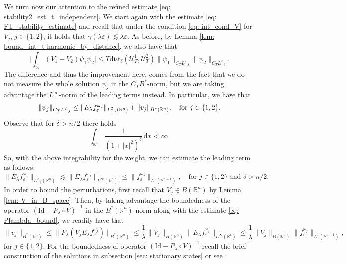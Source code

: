 \documentclass[10pt,a4paper]{amsart}
\theoremstyle{remark}
\theoremstyle{definition}
\newcommand{\R}{\mathbb{R}}
\newcommand{\Sph}{\mathbb{S}}
\newcommand{\dd}{\mathrm{d}}
\newcommand{\Id}{\mathrm{Id}}
\newcommand{\dist}{\mathrm{dist}}
\newcommand{\om}{\omega}
\def\ve{\varepsilon}
\def\lec{\lesssim}
\def\cal{\mathcal}
\def\ovl{\overline}
\begin{document}
We turn now our attention to the refined estimate  \eqref{eq: stability2_est_t_independent}. We start again with the estimate \eqref{eq: FT_stability_estimate} and recall that under the condition \eqref{eq: int_cond_V} for $V_j$, $j\in\{1, 2\}$, it holds that $\gamma(\lambda \ve) \lec \lambda \ve$. 
%
As before, by Lemma \ref{lem: bound_int_t-harmonic_by_distance}, we also have that 
%
\[
\Big| \int_\Sigma (V_1 - V_2)\psi_1 \ovl{\psi_2}\Big| \leq T \dist_\delta(\cal{U}^1_T, \cal{U}^2_T) \| \psi_1\|_{C_TL^2_{-\delta}} \|\psi_2\|_{C_TL^2_{-\delta}}.
\]
%
The difference and thus the improvement here, comes from the fact that we do not measure the whole solution $\psi_j$ in the $C_TB^*$-norm, but we are taking advantage the $L^\infty$-norm of the leading terms instead. 
In particular, we have that 
%
\[
\| \psi_j \|_{C_TL^2_{-\delta}} \leq \| E_\lambda f^{\om_j}_\ve \|_{L^2_{-\delta}(\R^n)} + \| v_j \|_{B^*(\R^n)}, \quad \textup{for} \,\, j\in\{1, 2\}. 
\]
%
%
Observe that for $\delta > n/2$ there holds 
\[
\int_{\R^n} \frac{1}{(1+|x|^2)^{\delta}} \, \dd x<\infty. 
\]
So, with the above integrability for the weight, we can estimate the leading term as follows: 
%
\begin{equation}\label{eq: Herglotz_bound}
\|E_\lambda f^{\om_j}_\ve \|_{L^2_{-\delta}(\R^n)} \lec \|E_\lambda f^{\om_j}_\ve\|_{L^\infty(\R^n)} \leq \|f^{\om_j}_\ve \|_{L^1(\Sph^{n-1})},
\quad \text{for} \,\, j\in\{1, 2\} \,\, \text{and} \,\, \delta>n/2.
\end{equation}
%
In order to bound the perturbations, first recall that $V_j\in B(\R^n)$ by Lemma \ref{lem: V_in_B_space}. Then, by taking advantage the boundedness of the operator $(\Id-P_\lambda \circ V)^{-1}$ in the $B^*(\R^n)$-norm along with the estimate \eqref{eq: Plambda_bound}, we readily have that 
%
\begin{equation}\label{eq: perturbation_Bstar_bound}
\| v_j \|_{B^*(\R^n)}\leq \| P_\lambda (V_j E_\lambda f^{\om_j}_\ve) \|_{B^*(\R^n)} \leq \frac{1}{\lambda} \| V_j \|_{B(\R^n)} \|E_\lambda f^{\om_j}_\ve \|_{L^\infty(\R^n)}
\leq \frac{1}{\lambda} \| V_j \|_{B(\R^n)} \|f^{\om_j}_\ve \|_{L^1(\Sph^{n-1})}, 
\end{equation}
%
for  $j\in\{1, 2\}$. For the boundedness of operator $(\Id-P_\lambda \circ V)^{-1}$ recall the brief construction of the solutions in subsection \ref{sec: stationary states} or see \cite[Corollary 2.4]{zbMATH08122191}.
\end{document}
